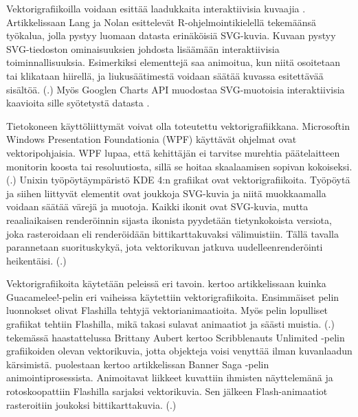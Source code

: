 \documentclass[utf8,bachelor]{gradu3}
\newcommand{\parencitedot}[1]{(\cite{#1}.)}
\begin{document}
Vektorigrafiikoilla voidaan esittää laadukkaita interaktiivisia kuvaajia \parencite{RefWorks:doc:5bdc736ae4b05afcfde5d6e4}. Artikkelissaan Lang ja Nolan esittelevät R-ohjelmointikielellä tekemäänsä työkalua, jolla pystyy luomaan datasta erinäköisiä SVG-kuvia. Kuvaan pystyy SVG-tiedoston ominaisuuksien johdosta lisäämään interaktiivisia toiminnallisuuksia. Esimerkiksi elementtejä saa animoitua, kun niitä osoitetaan tai klikataan hiirellä, ja liukusäätimestä voidaan säätää kuvassa esitettävää sisältöä. \parencitedot{RefWorks:doc:5bdc736ae4b05afcfde5d6e4} Myös Googlen Charts API muodostaa SVG-muotoisia interaktiivisia kaavioita sille syötetystä datasta \parencite{RefWorks:doc:5bde1508e4b0afdabde34e20}.

Tietokoneen käyttöliittymät voivat olla toteutettu vektorigrafiikkana. Microsoftin Windows Presentation Foundationia (WPF) käyttävät ohjelmat ovat vektoripohjaisia. WPF lupaa, että kehittäjän ei tarvitse murehtia päätelaitteen monitorin koosta tai resoluutiosta, sillä se hoitaa skaalaamisen sopivan kokoiseksi. \parencitedot{RefWorks:doc:5bde3d66e4b0a1f99c63ae5a} Unixin työpöytäympäristö KDE 4:n grafiikat ovat vektorigrafiikoita. Työpöytä ja siihen liittyvät elementit ovat joukkoja SVG-kuvia ja niitä muokkaamalla voidaan säätää värejä ja muotoja. Kaikki ikonit ovat SVG-kuvia, mutta reaaliaikaisen renderöinnin sijasta ikonista pyydetään tietynkokoista versiota, joka rasteroidaan eli renderöidään bittikarttakuvaksi välimuistiin. Tällä tavalla parannetaan suorituskykyä, jota vektorikuvan jatkuva uudelleenrenderöinti heikentäisi. \parencitedot{RefWorks:doc:5bded7f3e4b09dfad48b846c}

Vektorigrafiikoita käytetään peleissä eri tavoin. \textcite{RefWorks:doc:5bdc818be4b0965708b5a0f0} kertoo artikkelissaan kuinka Guacamelee!-pelin eri vaiheissa käytettiin vektorigrafiikoita. Ensimmäiset pelin luonnokset olivat Flashilla tehtyjä vektorianimaatioita. Myös pelin lopulliset grafiikat tehtiin Flashilla, mikä takasi sulavat animaatiot ja säästi muistia. \parencitedot{RefWorks:doc:5bdc818be4b0965708b5a0f0} \textcite{RefWorks:doc:5bdc7473e4b05afcfde5d742} tekemässä haastattelussa Brittany Aubert kertoo Scribblenauts Unlimited -pelin grafiikoiden olevan vektorikuvia, jotta objekteja voisi venyttää ilman kuvanlaadun kärsimistä. \textcite{RefWorks:doc:5bd88176e4b0afdabde2b8e2} puolestaan kertoo artikkelissan Banner Saga -pelin animointiprosessista. Animoitavat liikkeet kuvattiin ihmisten näyttelemänä ja rotoskoopattiin Flashilla sarjaksi vektorikuvia. Sen jälkeen Flash-animaatiot rasteroitiin joukoksi bittikarttakuvia. \parencitedot{RefWorks:doc:5bd88176e4b0afdabde2b8e2}
\end{document}

